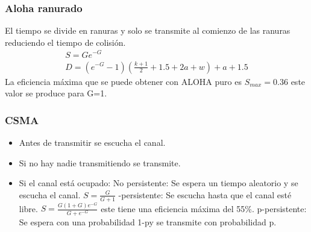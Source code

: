 \subsubsection{Aloha ranurado}
El tiempo se divide en ranuras y solo se transmite al comienzo de las ranuras reduciendo el tiempo de colisión.
\begin{align}
S=Ge^{-G}\\
D=(e^{-G}-1)(\frac{k+1}{2}+1.5+2a+w)+a+1.5
\end{align}
La eficiencia máxima que se puede obtener con ALOHA puro es $S_{max}=0.36$ este valor se produce para G=1.\\
\subsubsection{CSMA}
\begin{itemize}
\item Antes de transmitir se escucha el canal.
\item Si no hay nadie transmitiendo se transmite.
\item Si el canal está ocupado:
\subitem No persistente: Se espera un tiempo aleatorio y se escucha el canal. $S=\frac{G}{G+1}$
-persistente: Se escucha hasta que el canal esté libre. $S=\frac{G(1+G)e^{-G}}{G+e^{-G}}$ este tiene una eficiencia máxima del 55\%.
\subitem p-persistente: Se espera con una probabilidad 1-py se transmite con probabilidad p.
\end{itemize}